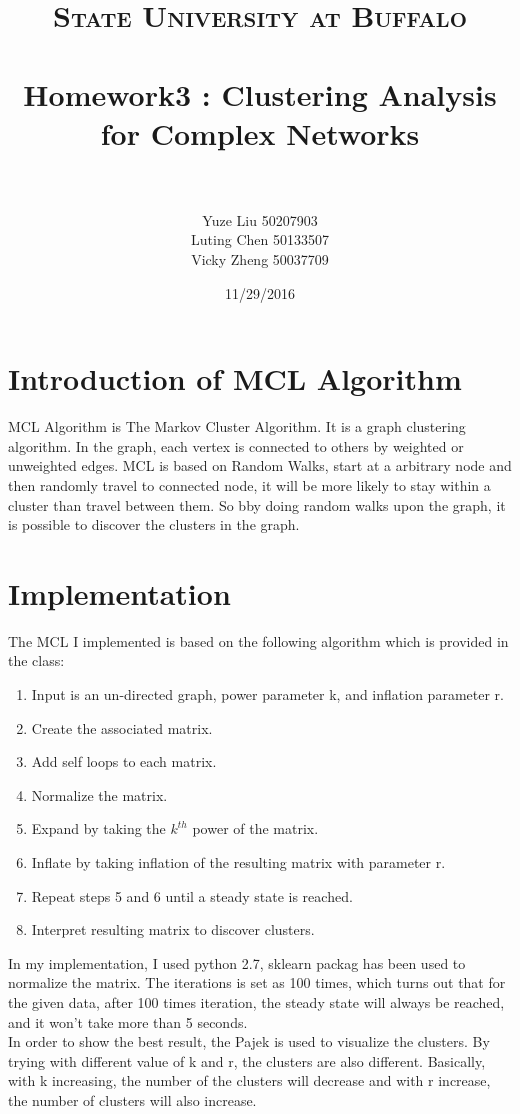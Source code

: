 \documentclass[paper=letter, fontsize=11pt]{article}
\title{
		\usefont{OT1}{bch}{b}{n}
		\normalfont \normalsize \textsc{State University at Buffalo} \\ [25pt]
		\horrule{0.5pt} \\[0.4cm]
		\Large Homework3 : Clustering Analysis for Complex Networks \\
		\horrule{2pt} \\[0.5cm]
}
\author{
		\normalfont\large 								
        Yuze Liu \hspace{1.2cm}50207903\\
        \normalfont\large 
        Luting Chen \hspace{0.5cm}50133507\\
        \normalfont\large 
        Vicky Zheng \hspace{0.5cm}50037709\\
}
\date{\large 11/29/2016}
\numberwithin{equation}{section}		%
\numberwithin{figure}{section}			%
\numberwithin{table}{section}				%
\begin{document}
\maketitle
\section{Introduction of MCL Algorithm}
MCL Algorithm is The Markov Cluster Algorithm. It is a graph clustering algorithm. In the graph, each vertex is connected to others by weighted or unweighted edges. MCL is based on Random Walks, start at a arbitrary node and then randomly travel to connected node, it will be more likely to stay within a cluster than travel between them. So bby doing random walks upon the graph, it is possible to discover the clusters in the graph.
\section{Implementation}
The MCL I implemented is based on the following algorithm which is provided in the class:
\begin{enumerate}
	\item Input is an un-directed graph, power parameter k, and inflation parameter r.
	\item Create the associated matrix.
	\item Add self loops to each matrix.
	\item Normalize the matrix.
	\item Expand by taking the $k^{th}$ power of the matrix.
	\item Inflate by taking inflation of the resulting matrix with parameter r.
	\item Repeat steps 5 and 6 until a steady state is reached.
	\item Interpret resulting matrix to discover clusters.
\end{enumerate}
In my implementation, I used python 2.7, sklearn packag has been used to normalize the matrix. The iterations is set as 100 times, which turns out that for the given data, after 100 times iteration, the steady state will always be reached, and it won't take more than 5 seconds.\\
In order to show the best result, the Pajek is used to visualize the clusters. By trying with different value of k and r, the clusters are also different. Basically, with k increasing, the number of the clusters will decrease and with r increase, the number of clusters will also increase.
\end{document}
